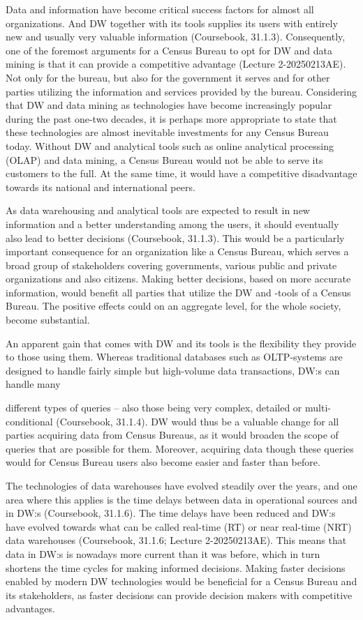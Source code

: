 Data and information have become critical success factors for almost all organizations. 
And DW together with its tools supplies its users with entirely new and usually very valuable information (Coursebook, 31.1.3)\cite[chapter~31.1.3]{CourseLitt}. 
Consequently, one of the foremost arguments for a Census Bureau to opt for DW and data mining is that it can provide a competitive advantage (Lecture 2-20250213AE). 
Not only for the bureau, but also for the government it serves and for other parties utilizing the information and services provided by the bureau. 
Considering that DW and data mining as technologies have become increasingly popular during the past one-two decades, 
it is perhaps more appropriate to state that these technologies are almost inevitable investments for any Census Bureau today. 
Without DW and analytical tools such as online analytical processing (OLAP) and data mining, 
a Census Bureau would not be able to serve its customers to the full. 
At the same time, it would have a competitive disadvantage towards its national and international peers.


As data warehousing and analytical tools are expected to result in new information and a better understanding among the users,
 it should eventually also lead to better decisions (Coursebook, 31.1.3). 
 This would be a particularly important consequence for an organization like a Census Bureau, 
 which serves a broad group of stakeholders covering governments, 
 various public and private organizations and also citizens. 
 Making better decisions, based on more accurate information, would benefit all parties that utilize the DW and -tools of a Census Bureau. 
 The positive effects could on an aggregate level, for the whole society, become substantial.


An apparent gain that comes with DW and its tools is the flexibility they provide to those using them. 
Whereas traditional databases such as OLTP-systems are designed to handle fairly simple but high-volume data transactions, DW:s can handle many


different types of queries -- also those being very complex, detailed or multi-conditional (Coursebook, 31.1.4). 
DW would thus be a valuable change for all parties acquiring data from Census Bureaus, 
as it would broaden the scope of queries that are possible for them. 
Moreover, acquiring data though these queries would for Census Bureau users also become easier and faster than before.


The technologies of data warehouses have evolved steadily over the years, 
and one area where this applies is the time delays between data in operational sources and in DW:s (Coursebook, 31.1.6). 
The time delays have been reduced and DW:s have evolved towards what can be called real-time (RT) or near real-time (NRT) data warehouses (Coursebook, 31.1.6; Lecture 2-20250213AE). 
This means that data in DW:s is nowadays more current than it was before, 
which in turn shortens the time cycles for making informed decisions. 
Making faster decisions enabled by modern DW technologies would be beneficial for a Census Bureau and its stakeholders, 
as faster decisions can provide decision makers with competitive advantages.


